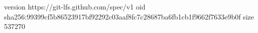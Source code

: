 version https://git-lfs.github.com/spec/v1
oid sha256:99399cf5b86523917bf92292c03aaf8fc7c28687ba6fb1cb1f9662f7633e9b0f
size 537270
